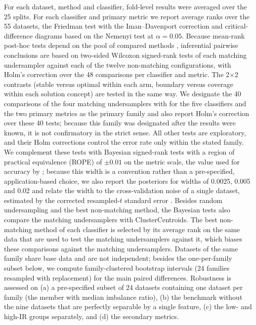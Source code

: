 For each dataset, method and classifier, fold-level results were averaged over the 25 splits. For each classifier and primary metric we report average ranks over the 55 datasets, the Friedman test with the Iman--Davenport correction \citep{friedman1937use,iman1980approximations,demsar2006statistical} and critical-difference diagrams based on the Nemenyi test at $\alpha=0.05$. Because mean-rank post-hoc tests depend on the pool of compared methods \citep{benavoli2016should}, inferential pairwise conclusions are based on two-sided Wilcoxon signed-rank tests \citep{wilcoxon1945individual} of each matching undersampler against each of the twelve non-matching configurations, with Holm's correction \citep{holm1979simple} over the 48 comparisons per classifier and metric. The 2$\times$2 contrasts (stable versus optimal within each arm, boundary versus coverage within each solution concept) are tested in the same way. We designate the 40 comparisons of the four matching undersamplers with \RUS{} for the five classifiers and the two primary metrics as the primary family and also report Holm's correction over these 40 tests; because this family was designated after the results were known, it is not confirmatory in the strict sense. All other tests are exploratory, and their Holm corrections control the error rate only within the stated family. We complement these tests with Bayesian signed-rank tests \citep{benavoli2017time} with a region of practical equivalence (ROPE) of $\pm 0.01$ on the metric scale, the value used for accuracy by \citet{benavoli2017time}; because this width is a convention rather than a pre-specified, application-based choice, we also report the posteriors for widths of 0.0025, 0.005 and 0.02 and relate the width to the cross-validation noise of a single dataset, estimated by the corrected resampled-$t$ standard error \citep{nadeau2003inference}. Besides random undersampling and the best non-matching method, the Bayesian tests also compare the matching undersamplers with ClusterCentroids. The best non-matching method of each classifier is selected by its average rank on the same data that are used to test the matching undersamplers against it, which biases these comparisons against the matching undersamplers. Datasets of the same family share base data and are not independent; besides the one-per-family subset below, we compute family-clustered bootstrap intervals (24 families resampled with replacement) for the main paired differences. Robustness is assessed on (a) a pre-specified subset of 24 datasets containing one dataset per family (the member with median imbalance ratio), (b) the benchmark without the nine datasets that are perfectly separable by a single feature, (c) the low- and high-IR groups separately, and (d) the secondary metrics.


